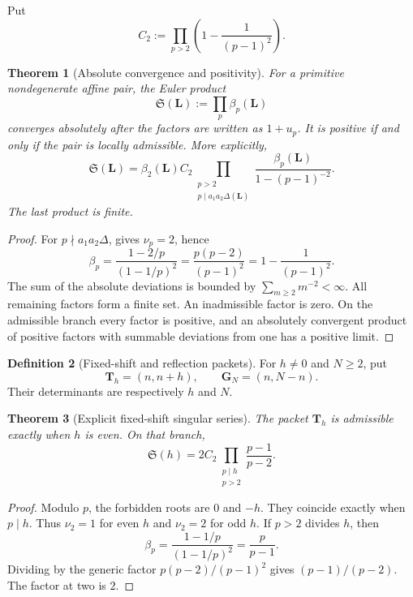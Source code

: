 \documentclass[11pt]{article}
\newtheorem{theorem}{Theorem}[section]
\theoremstyle{definition}
\newtheorem{definition}[theorem]{Definition}
\theoremstyle{remark}
\begin{document}
Put
\[
 C_2:=\prod_{p>2}\left(1-\frac1{(p-1)^2}\right).
 \tag{4.1}
\]

\begin{theorem}[Absolute convergence and positivity]
\label{thm:series-convergence}
For a primitive nondegenerate affine pair, the Euler product
\[
 \boxed{\mathfrak S(\bm L):=\prod_p\beta_p(\bm L)}
 \tag{4.2}
\]
converges absolutely after the factors are written as $1+u_p$.  It is positive
if and only if the pair is locally admissible.  More explicitly,
\[
 \boxed{
 \mathfrak S(\bm L)
 =\beta_2(\bm L)C_2
  \prod_{\substack{p>2\\p\mid a_1a_2\Delta(\bm L)}}
  \frac{\beta_p(\bm L)}{1-(p-1)^{-2}}.}
 \tag{4.3}
\]
The last product is finite.
\end{theorem}

\begin{proof}
For $p\nmid a_1a_2\Delta$,  gives $\nu_p=2$, hence
\[
 \beta_p=\frac{1-2/p}{(1-1/p)^2}
 =\frac{p(p-2)}{(p-1)^2}
 =1-\frac1{(p-1)^2}.
\]
The sum of the absolute deviations is bounded by
$\sum_{m\ge2}m^{-2}<\infty$.  All remaining factors form a finite set.
An inadmissible factor is zero.  On the admissible branch every factor is
positive, and an absolutely convergent product of positive factors with
summable deviations from one has a positive limit.
\end{proof}

\begin{definition}[Fixed-shift and reflection packets]
For $h\ne0$ and $N\ge2$, put
\[
 \bm T_h=(n,n+h),
 \qquad
 \bm G_N=(n,N-n).
 \tag{4.4}
\]
Their determinants are respectively $h$ and $N$.
\end{definition}

\begin{theorem}[Explicit fixed-shift singular series]
\label{thm:shift-series}
The packet $\bm T_h$ is admissible exactly when $h$ is even.  On that branch,
\[
 \boxed{
 \mathfrak S(h)
 =2C_2\prod_{\substack{p\mid h\\p>2}}
       \frac{p-1}{p-2}.}
 \tag{4.5}
\]
\end{theorem}

\begin{proof}
Modulo $p$, the forbidden roots are $0$ and $-h$.  They coincide exactly when
$p\mid h$.  Thus $\nu_2=1$ for even $h$ and $\nu_2=2$ for odd $h$.  If
$p>2$ divides $h$, then
\[
 \beta_p=\frac{1-1/p}{(1-1/p)^2}=\frac p{p-1}.
\]
Dividing by the generic factor $p(p-2)/(p-1)^2$ gives
$(p-1)/(p-2)$.  The factor at two is $2$.
\end{proof}
\end{document}
